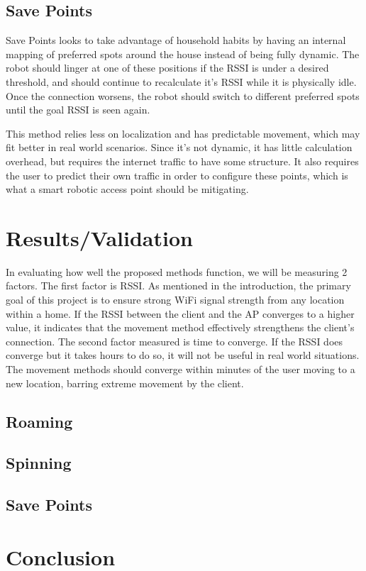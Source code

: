 \subsection{Save Points}
Save Points looks to take advantage of household habits by having an internal mapping of preferred spots around the house instead of being fully dynamic. The robot should linger at one of these positions if the RSSI is under a desired threshold, and should continue to recalculate it’s RSSI while it is physically idle. Once the connection worsens, the robot should switch to different preferred spots until the goal RSSI is seen again.\par
This method relies less on localization and has predictable movement, which may fit better in real world scenarios. Since it’s not dynamic, it has little calculation overhead, but requires the internet traffic to have some structure. It also requires the user to predict their own traffic in order to configure these points, which is what a smart robotic access point should be mitigating.


\section{Results/Validation}
In evaluating how well the proposed methods function, we will be measuring 2 factors. The first factor is RSSI. As mentioned in the introduction, the primary goal of this project is to ensure strong WiFi signal strength from any location within a home. If the RSSI between the client and the AP converges to a higher value, it indicates that the movement method effectively strengthens the client’s connection. The second factor measured is time to converge. If the RSSI does converge but it takes hours to do so, it will not be useful in real world situations. The movement methods should converge within minutes of the user moving to a new location, barring extreme movement by the client.  
\subsection{Roaming}
\subsection{Spinning}
\subsection{Save Points}

\section{Conclusion}
\blindtext

